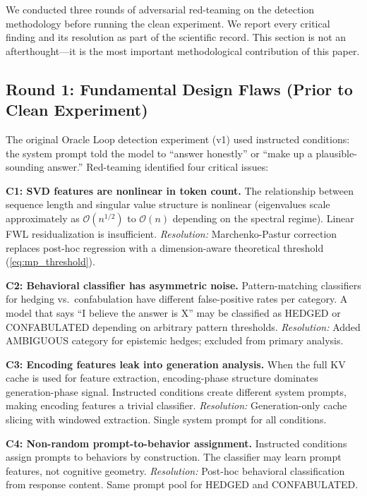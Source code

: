 We conducted three rounds of adversarial red-teaming on the detection
methodology before running the clean experiment. We report every critical
finding and its resolution as part of the scientific record. This section
is not an afterthought---it is the most important methodological
contribution of this paper.

\subsection{Round 1: Fundamental Design Flaws (Prior to Clean Experiment)}

The original Oracle Loop detection experiment (v1) used instructed
conditions: the system prompt told the model to ``answer honestly'' or
``make up a plausible-sounding answer.'' Red-teaming identified four
critical issues:

\begin{redteam}
\textbf{C1: SVD features are nonlinear in token count.} The relationship
between sequence length and singular value structure is nonlinear
(eigenvalues scale approximately as $\mathcal{O}(n^{1/2})$ to
$\mathcal{O}(n)$ depending on the spectral regime). Linear FWL
residualization is insufficient. \textit{Resolution:} Marchenko-Pastur
correction replaces post-hoc regression with a dimension-aware theoretical
threshold (\cref{eq:mp_threshold}).
\end{redteam}

\begin{redteam}
\textbf{C2: Behavioral classifier has asymmetric noise.} Pattern-matching
classifiers for hedging vs.\ confabulation have different false-positive
rates per category. A model that says ``I believe the answer is X'' may be
classified as HEDGED or CONFABULATED depending on arbitrary pattern
thresholds. \textit{Resolution:} Added AMBIGUOUS category for epistemic
hedges; excluded from primary analysis.
\end{redteam}

\begin{redteam}
\textbf{C3: Encoding features leak into generation analysis.} When the
full KV cache is used for feature extraction, encoding-phase structure
dominates generation-phase signal. Instructed conditions create different
system prompts, making encoding features a trivial classifier.
\textit{Resolution:} Generation-only cache slicing with windowed
extraction. Single system prompt for all conditions.
\end{redteam}

\begin{redteam}
\textbf{C4: Non-random prompt-to-behavior assignment.} Instructed
conditions assign prompts to behaviors by construction. The classifier
may learn prompt features, not cognitive geometry.
\textit{Resolution:} Post-hoc behavioral classification from response
content. Same prompt pool for HEDGED and CONFABULATED.
\end{redteam}

